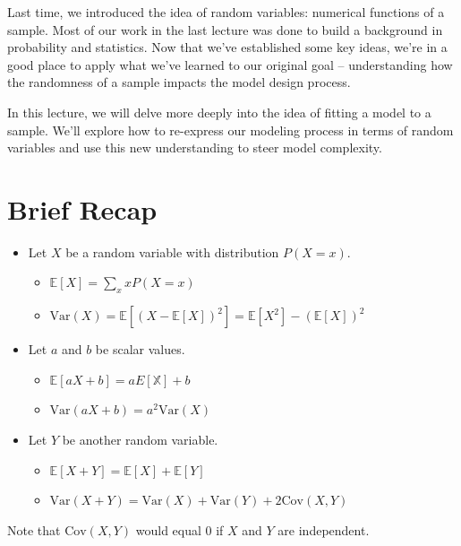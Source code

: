\documentclass[
  letterpaper,
  DIV=11,
  numbers=noendperiod]{scrreprt}
\providecommand{\tightlist}{%
  \setlength{\itemsep}{0pt}\setlength{\parskip}{0pt}}\usepackage{longtable,booktabs,array}
\begin{document}
Last time, we introduced the idea of random variables: numerical
functions of a sample. Most of our work in the last lecture was done to
build a background in probability and statistics. Now that we've
established some key ideas, we're in a good place to apply what we've
learned to our original goal -- understanding how the randomness of a
sample impacts the model design process.

In this lecture, we will delve more deeply into the idea of fitting a
model to a sample. We'll explore how to re-express our modeling process
in terms of random variables and use this new understanding to steer
model complexity.

\section{Brief Recap}\label{brief-recap}

\begin{itemize}
\tightlist
\item
  Let \(X\) be a random variable with distribution \(P(X=x)\).

  \begin{itemize}
  \tightlist
  \item
    \(\mathbb{E}[X] = \sum_{x} x P(X=x)\)
  \item
    \(\text{Var}(X) = \mathbb{E}[(X-\mathbb{E}[X])^2] = \mathbb{E}[X^2] - (\mathbb{E}[X])^2\)
  \end{itemize}
\item
  Let \(a\) and \(b\) be scalar values.

  \begin{itemize}
  \tightlist
  \item
    \(\mathbb{E}[aX+b] = aE[\mathbb{X}] + b\)
  \item
    \(\text{Var}(aX+b) = a^2 \text{Var}(X)\)
  \end{itemize}
\item
  Let \(Y\) be another random variable.

  \begin{itemize}
  \tightlist
  \item
    \(\mathbb{E}[X+Y] = \mathbb{E}[X] + \mathbb{E}[Y]\)
  \item
    \(\text{Var}(X + Y) = \text{Var}(X) + \text{Var}(Y) + 2\text{Cov}(X,Y)\)
  \end{itemize}
\end{itemize}

Note that \(\text{Cov}(X,Y)\) would equal 0 if \(X\) and \(Y\) are
independent.
\end{document}
